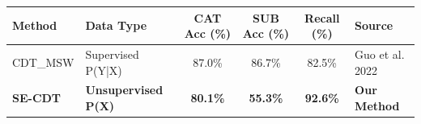 \begin{tabular}{|l|l|c|c|c|l|}
\hline
\textbf{Method} & \textbf{Data Type} & \textbf{CAT Acc (\%)} & \textbf{SUB Acc (\%)} & \textbf{Recall (\%)} & \textbf{Source} \\
\hline
CDT\_MSW & Supervised P(Y|X) & 87.0\% & 86.7\% & 82.5\% & Guo et al. 2022 \\
\textbf{SE-CDT} & \textbf{Unsupervised P(X)} & \textbf{80.1\%} & \textbf{55.3\%} & \textbf{92.6\%} & \textbf{Our Method} \\
\hline
\end{tabular}